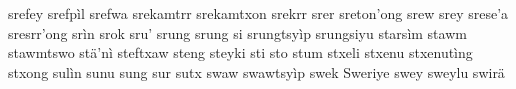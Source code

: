 \documentclass[a4paper]{article}
\begin{document}
srefey\hspace{2mm}
srefpìl\hspace{2mm}
srefwa\hspace{2mm}
srekamtrr\hspace{2mm}
srekamtxon\hspace{2mm}
srekrr\hspace{2mm}
srer\hspace{2mm}
sreton'ong\hspace{2mm}
srew\hspace{2mm}
srey\hspace{2mm}
srese'a\hspace{2mm}
sresrr'ong\hspace{2mm}
srìn\hspace{2mm}
srok\hspace{2mm}
sru'\hspace{2mm}
srung\hspace{2mm}
srung si\hspace{2mm}
srungtsyìp\hspace{2mm}
srungsiyu\hspace{2mm}
starsìm\hspace{2mm}
stawm\hspace{2mm}
stawmtswo\hspace{2mm}
stä'nì\hspace{2mm}
steftxaw\hspace{2mm}
steng\hspace{2mm}
steyki\hspace{2mm}
sti\hspace{2mm}
sto\hspace{2mm}
stum\hspace{2mm}
stxeli\hspace{2mm}
stxenu\hspace{2mm}
stxenutìng\hspace{2mm}
stxong\hspace{2mm}
sulìn\hspace{2mm}
sunu\hspace{2mm}
sung\hspace{2mm}
sur\hspace{2mm}
sutx\hspace{2mm}
swaw\hspace{2mm}
swawtsyìp\hspace{2mm}
swek\hspace{2mm}
Sweriye\hspace{2mm}
swey\hspace{2mm}
sweylu\hspace{2mm}
swirä\hspace{2mm}
\end{document}
